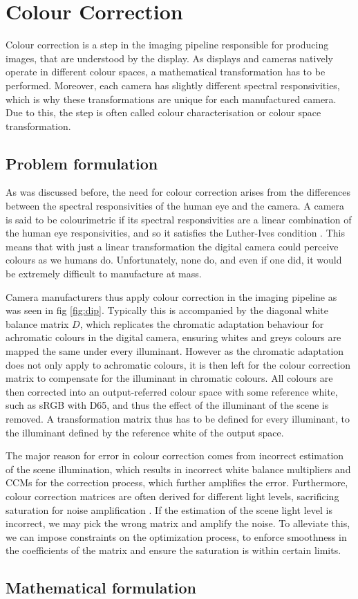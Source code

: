 \chapter{Colour Correction}%
\label{ch:cc}

Colour correction is a step in the imaging pipeline responsible for producing images, that are understood by the display. As displays and cameras natively operate in different colour spaces, a mathematical transformation has to be performed. Moreover, each camera has slightly different spectral responsivities, which is why these transformations are unique for each manufactured camera. Due to this, the step is often called colour characterisation or colour space transformation.

\section{Problem formulation}

As was discussed before, the need for colour correction arises from the differences between the spectral responsivities of the human eye and the camera. A camera is said to be colourimetric if its spectral responsivities are a linear combination of the human eye responsivities, and so it satisfies the Luther-Ives condition \cite{luther, ives, nakamura}. This means that with just a linear transformation the digital camera could perceive colours as we humans do. Unfortunately, none do, and even if one did, it would be extremely difficult to manufacture at mass.

Camera manufacturers thus apply colour correction in the imaging pipeline as was seen in fig \ref{fig:dip}. Typically this is accompanied by the diagonal white balance matrix $D$, which replicates the chromatic adaptation behaviour for achromatic colours in the digital camera, ensuring whites and greys colours are mapped the same under every illuminant. However as the chromatic adaptation does not only apply to achromatic colours, it is then left for the colour correction matrix to compensate for the illuminant in chromatic colours. All colours are then corrected into an output-referred colour space with some reference white, such as sRGB with D65, and thus the effect of the illuminant of the scene is removed. A transformation matrix thus has to be defined for every illuminant, to the illuminant defined by the reference white of the output space.

The major reason for error in colour correction comes from incorrect estimation of the scene illumination, which results in incorrect white balance multipliers and CCMs for the correction process, which further amplifies the error. Furthermore, colour correction matrices are often derived for different light levels, sacrificing saturation for noise amplification \cite{satvsnoise}. If the estimation of the scene light level is incorrect, we may pick the wrong matrix and amplify the noise. To alleviate this, we can impose constraints on the optimization process, to enforce smoothness in the coefficients of the matrix and ensure the saturation is within certain limits.

\section{Mathematical formulation}